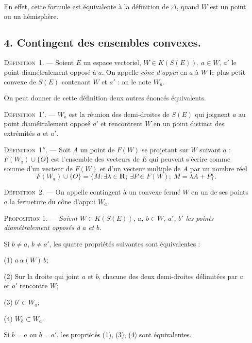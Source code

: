 \documentclass[11pt]{article}
\newcommand{\R}{\boldsymbol{R}}
\newcommand{\bznum}[1]{\if\relax\detokenize{#1}\relax\else\ #1\fi}
\newenvironment{defin}[1][]{\par\medskip\noindent\textsc{Définition\bznum{#1}.} --- }{\par\medskip}
\newenvironment{prop}[1][]{\par\medskip\noindent\textsc{Proposition #1.} --- \itshape}{\par\medskip}
\newenvironment{proof}[1][]{\par}{\par}
\begin{document}
\begin{proof}
En effet, cette formule est équivalente à la définition de $\Delta$, quand $W$ est un point ou un
hémisphère.
\end{proof}

\subsection*{4. Contingent des ensembles convexes.}

\begin{defin}[1]
Soient $E$ un espace vectoriel, $W\in K(S(E))$, $a\in W$, $a'$ le point diamétralement opposé à
$a$. On appelle \textit{cône d'appui} en $a$ à $W$ le plus petit convexe de $S(E)$ contenant $W$
et $a'$ : on le note $W_a$.
\end{defin}

On peut donner de cette définition deux autres énoncés équivalents.

\begin{defin}[1$'$]
$W_a$ est la réunion des demi-droites de $S(E)$ qui joignent $a$ au point diamétralement opposé
$a'$ et rencontrent $W$ en un point distinct des extrémités $a$ et $a'$.
\end{defin}

\begin{defin}[1$''$]
Soit $A$ un point de $F(W)$ se projetant sur $W$ suivant $a$ : $F(W_a)\cup\{O\}$ est l'ensemble
des vecteurs de $E$ qui peuvent s'écrire comme somme d'un vecteur de $F(W)$ et d'un vecteur
multiple de $A$ par un nombre réel
\[ F(W_a)\cup\{O\}=\{M : \exists\lambda\in\R;\ \exists P\in F(W);\ M=\lambda A+P\}. \]
\end{defin}

\begin{defin}[2]
On appelle contingent à un convexe fermé $W$ en un de ses points $a$ la fermeture du
cône d'appui $W_a$.
\end{defin}

\begin{prop}[1]
Soient $W\in K(S(E))$, $a$, $b\in W$, $a'$, $b'$ les points diamétralement opposés à $a$ et $b$.

Si $b\neq a$, $b\neq a'$, les quatre propriétés suivantes sont équivalentes :

(1) $a\,\alpha(W)\,b$;

(2) Sur la droite qui joint $a$ et $b$, chacune des deux demi-droites délimitées par $a$ et $a'$
rencontre $W$;

(3) $b'\in W_a$;

(4) $W_b\subset W_a$.

Si $b=a$ ou $b=a'$, les propriétés (1), (3), (4) sont équivalentes.
\end{prop}
\end{document}
